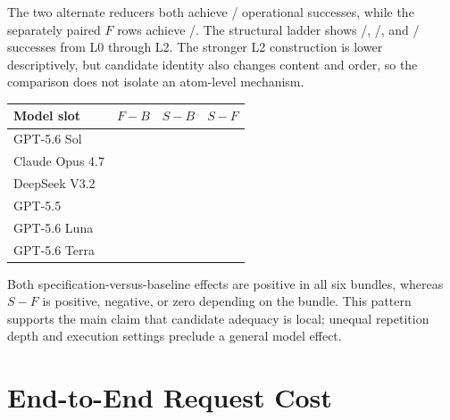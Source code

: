 The two alternate reducers both achieve \ReducerDAGSuccess{}/\ReducerCandidateRows{} operational successes, while the separately paired $F$ rows achieve \ReducerFSuccess{}/\ReducerFRows{}. The structural ladder shows \LadderLZeroSuccess{}/\LadderCandidateRows{}, \LadderLOneSuccess{}/\LadderCandidateRows{}, and \LadderLTwoSuccess{}/\LadderCandidateRows{} successes from L0 through L2. The stronger L2 construction is lower descriptively, but candidate identity also changes content and order, so the comparison does not isolate an atom-level mechanism.

\begin{center}
\label{tab:model-anchors}
\footnotesize
\setlength{\tabcolsep}{4pt}
\begin{tabular}{lrrr}
\toprule
Model slot & $F-B$ & $S-B$ & $S-F$ \\
\midrule
GPT-5.6 Sol & \SolAnchorFBEffect{} & \SolAnchorSBEffect{} & \SolAnchorSFEffect{} \\
Claude Opus 4.7 & \ClaudeAnchorFBEffect{} & \ClaudeAnchorSBEffect{} & \ClaudeAnchorSFEffect{} \\
DeepSeek V3.2 & \DeepSeekAnchorFBEffect{} & \DeepSeekAnchorSBEffect{} & \DeepSeekAnchorSFEffect{} \\
GPT-5.5 & \GPTFiveFiveAnchorFBEffect{} & \GPTFiveFiveAnchorSBEffect{} & \GPTFiveFiveAnchorSFEffect{} \\
GPT-5.6 Luna & \LunaAnchorFBEffect{} & \LunaAnchorSBEffect{} & \LunaAnchorSFEffect{} \\
GPT-5.6 Terra & \TerraAnchorFBEffect{} & \TerraAnchorSBEffect{} & \TerraAnchorSFEffect{} \\
\bottomrule
\end{tabular}
\end{center}

Both specification-versus-baseline effects are positive in all six bundles, whereas $S-F$ is positive, negative, or zero depending on the bundle. This pattern supports the main claim that candidate adequacy is local; unequal repetition depth and execution settings preclude a general model effect.

\section{End-to-End Request Cost}
\label{app:request-cost}


